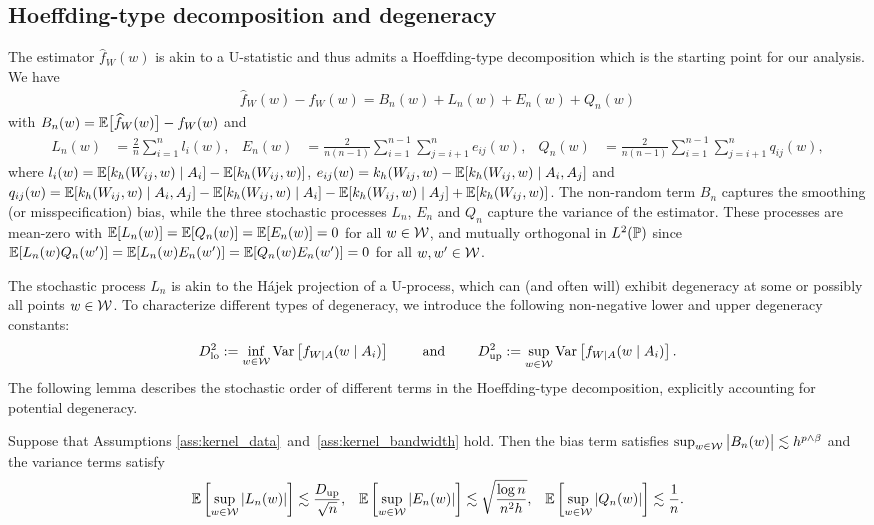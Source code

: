 \subsection{Hoeffding-type decomposition and degeneracy}
\label{sec:degeneracy}

The estimator $\widehat{f}_W(w)$ is akin to a
U-statistic and thus admits a Hoeffding-type decomposition
which is the starting point for our analysis. We have
%
\begin{align}\label{eq:h-decomposition}
  \widehat{f}_W(w) - f_W(w) = B_n(w) + L_n(w) + E_n(w) + Q_n(w)
\end{align}
%
with
$B_n(w) = \E\big[\widehat{f}_W(w)\big] - f_W(w)$
and
%
\begin{align*}
  L_n(w)
  &= \frac{2}{n} \sum_{i=1}^n l_i(w),
  &
  E_n(w)
  &= \frac{2}{n(n-1)} \sum_{i=1}^{n-1} \sum_{j=i+1}^{n} e_{ij}(w),
  &
  Q_n(w)
  &= \frac{2}{n(n-1)} \sum_{i=1}^{n-1} \sum_{j=i+1}^{n} q_{ij}(w),
\end{align*}
%
where
$l_i(w) = \E[k_h(W_{ij},w) \mid A_i] - \E[k_h(W_{ij},w)]$,
$e_{ij}(w) = k_h(W_{ij},w) - \E[k_h(W_{ij},w) \mid A_i, A_j]$
and
$q_{ij}(w) = \E[k_h(W_{ij},w) \mid A_i, A_j] - \E[k_h(W_{ij},w) \mid A_i]
- \E[k_h(W_{ij},w) \mid A_j] + \E[k_h(W_{ij},w)]$.
The non-random term $B_n$ captures the smoothing (or misspecification) bias,
while the three stochastic processes $L_n$, $E_n$ and $Q_n$
capture the variance of the estimator.
These processes are
mean-zero with $\E[L_n(w)] = \E[Q_n(w)] = \E[E_n(w)] = 0$ for all $w \in \cW$,
and mutually orthogonal in $L^2(\P)$ since
$\E[L_n(w) Q_n(w')] = \E[L_n(w) E_n(w')] = \E[Q_n(w) E_n(w')] = 0$
for all $w, w' \in \cW$.

The stochastic process $L_n$ is akin to the H\'{a}jek projection of a U-process,
which can (and often will) exhibit degeneracy at some
or possibly all points $w \in \cW$.
To characterize different types of degeneracy,
we introduce the following non-negative lower and upper degeneracy constants:
%
\[
  \Dl^2 := \inf_{w \in \cW} \Var\left[f_{W \mid A}(w \mid A_i)\right]
  \qquad \text{ and } \qquad
  \Du^2 := \sup_{w \in \cW} \Var\left[f_{W \mid A}(w \mid A_i)\right].
\]
%
The following lemma describes the stochastic order of
different terms in the Hoeffding-type decomposition,
explicitly accounting for potential degeneracy.

\begin{lemma} \label{lem:variance}
  Suppose that Assumptions \ref{ass:kernel_data}~and~\ref{ass:kernel_bandwidth}
  hold.
  Then the bias term satisfies
  $\sup_{w \in \cW} \big| B_n(w) \big| \lesssim h^{p\wedge\beta}$
  and the variance terms satisfy
  \begin{align*}
    \E\left[ \sup_{w \in \cW} |L_n(w)| \right]
    &\lesssim
    \frac{\Du}{\sqrt n},
    &
    \E\left[ \sup_{w \in \cW} |E_n(w)| \right]
    &\lesssim \sqrt{\frac{\log n}{n^2h}},
    &
    \E\left[ \sup_{w \in \cW} |Q_n(w)| \right]
    \lesssim \frac{1}{n}.
  \end{align*}
\end{lemma}

